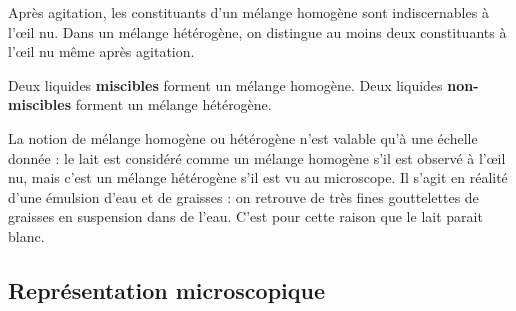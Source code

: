 \documentclass[12pt,a4paper]{article}
\begin{document}
\begin{remarque}
Après agitation, les constituants d'un mélange homogène sont indiscernables à l'œil nu.
Dans un mélange hétérogène, on distingue au moins deux constituants à l'œil nu même après agitation.
\end{remarque}

\begin{definition}
Deux liquides \textbf{miscibles} forment un mélange homogène.
Deux liquides \textbf{non-miscibles} forment un mélange hétérogène.
\end{definition}

\begin{remarque}
La notion de mélange homogène ou hétérogène n'est valable qu'à une échelle donnée : le lait est considéré comme un mélange homogène s'il est observé à l'œil nu, mais c'est un mélange hétérogène s'il est vu au microscope.
Il s'agit en réalité d'une émulsion d'eau et de graisses : on retrouve de très fines gouttelettes de graisses en suspension dans de l'eau.
C'est pour cette raison que le lait parait blanc.
\end{remarque}

\subsection{Représentation microscopique}
\end{document}
